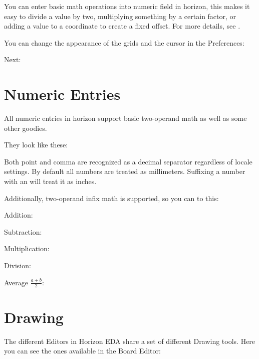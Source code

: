 \documentclass[letterpaper,10pt,czech]{sphinxmanual}
\begin{document}
You can enter basic math operations into  numeric field in horizon, this makes it easy to divide a value by two, multiplying something by a certain factor, or adding a value to a coordinate to create a fixed offset. For more details, see {\hyperref[\detokenize{entries::doc}]{}}.

You can change the appearance of the grids and the cursor in the Preferences:

\noindent{}

Next: {\hyperref[\detokenize{drawing::doc}]{}}


\chapter{Numeric Entries}
\label{\detokenize{entries:numeric-entries}}\label{\detokenize{entries::doc}}
All numeric entries in horizon support basic two-operand math as well as some other goodies.

They look like these:

\noindent{}

Both point and comma are recognized as a decimal separator regardless of locale settings. By default all numbers are treated as millimeters. Suffixing a number with an  will treat it as inches.

Additionally, two-operand infix math is supported, so you can to this:

Addition: 

Subtraction: 

Multiplication: 

Division: 

Average \(\frac{ a+b }{2}\): 


\chapter{Drawing}
\label{\detokenize{drawing:drawing}}\label{\detokenize{drawing::doc}}
The different Editors in Horizon EDA share a set of different Drawing tools. Here you can see the ones available in the Board Editor:

\noindent{}
\end{document}
